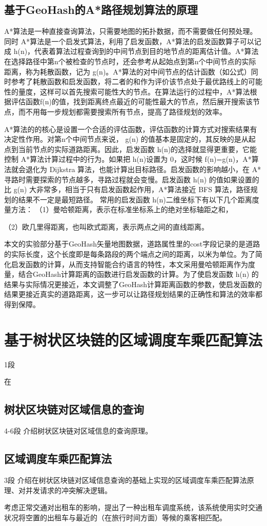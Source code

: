 \subsection{基于GeoHash的A*路径规划算法的原理}
A*算法是一种直接查询算法，只需要地图的拓扑数据，而不需要做任何预处理。同时 A*算法是一个启发式算法，利用了启发函数，A*算法的启发函数算子可以记成 h(n)，代表着算法过程查询到的中间节点到目的地节点的距离估计值。A*算法在选择路径中第n个被检查的节点时，还会参考从起始点到第n个中间节点的实际距离，称为耗散函数，记为 g(n)。A*算法的对中间节点的估计函数（如公式）同时参考了耗散函数和启发函数，将二者的和作为评价该节点处于最优路线上的可能性的量度，这样可以首先搜索可能性大的节点。在算法运行的过程中，A*算法根据评估函数f(n)的值，找到距离终点最近的可能性最大的节点，然后展开搜索该节点，而不用每一步规划都需要搜索所有节点，提高了路径规划的效率。

A*算法的的核心是设置一个合适的评估函数，评估函数的计算方式对搜索结果有决定性作用。对第n个中间节点来说， g(n) 的值基本是固定的，其反映的是从起点到当前节点的实际道路距离。因此，启发函数 h(n)的选择就显得更重要，它能控制 A*算法计算过程中的行为。如果把 h(n)设置为 0，这时候 f(n)=g(n)，A*算法就会退化为 Dijkstra 算法，也能计算出目标路径。启发函数的影响越小，在 A*寻路时需要探索的节点越多，寻路过程就会变慢。启发函数 h(n) 的值如果设置的比 g(n) 大非常多，相当于只有启发函数起作用，A*算法接近 BFS 算法，路径规划的结果不一定是最短路径。
常用的启发函数 h(n)二维坐标下有以下几个距离度量方法：
（1）曼哈顿距离，表示在标准坐标系上的绝对坐标轴距之和，

（2）欧几里得距离，也叫欧式距离，表示两点之间的直线距离。

本文的实验部分基于GeoHash矢量地图数据，道路属性里的cost字段记录的是道路的实际长度，这个长度即是每条路段的两个端点之间的距离，以米为单位。为了简化启发函数的计算，从而支持智能合约语言的特性，本文采用曼哈顿距离作为度量，结合GeoHash计算距离的函数进行启发函数的计算。为了使启发函数 h(n) 的结果与实际情况更接近，本文调整了GeoHash计算距离函数的参数，使启发函数的结果更接近真实的道路距离，这一步可以让路径规划结果的正确性和算法的效率都得到保障。


\section{基于树状区块链的区域调度车乘匹配算法}1段

在

\subsection{树状区块链对区域信息的查询}4-6段
介绍树状区块链对区域信息的查询原理。


\subsection{区域调度车乘匹配算法}3段
介绍在树状区块链对区域信息查询的基础上实现的区域调度车乘匹配算法原理、对并发请求的冲突解决逻辑。



考虑正常交通对出租车的影响，提出了一种出租车调度系统，该系统使用实时交通状况将空置的出租车与最近的（在旅行时间方面）等候的乘客相匹配。